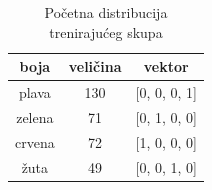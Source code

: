 \begin{table}
\centering
\begin{tabular}{|c|c|c|}
\hline
boja   & veličina & vektor \\ \hline
plava  & 130 &  [0, 0, 0, 1]    \\ \hline
zelena & 71  &  [0, 1, 0, 0]     \\ \hline
crvena & 72  &  [1, 0, 0, 0]  \\ \hline
žuta   & 49  &  [0, 0, 1, 0]  \\ \hline
\end{tabular}
\caption{Početna distribucija trenirajućeg skupa}
\label{table:initial_class_distribution}
\end{table}

